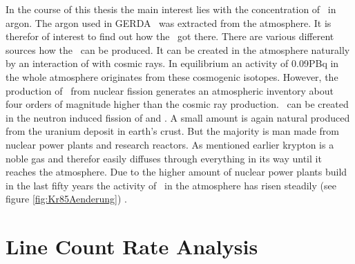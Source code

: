 \documentclass[encoding=utf8,british]{tumphthesis}
\begin{document}
In the course of this thesis the main interest lies with the concentration of \Kr\ in argon.
The argon used in GERDA \PII\ was extracted from the atmosphere.
It is therefor of interest to find out how the \Kr\ got there.
There are various different sources how the \Kr\ can be produced.
It can be created in the atmosphere naturally by an interaction of  with cosmic rays.
In equilibrium an activity of 0.09PBq in the whole atmosphere originates from these cosmogenic isotopes.
However, the production of \Kr\ from nuclear fission generates an atmospheric inventory about four orders of magnitude higher than the cosmic ray production.
\Kr\ can be created in the neutron induced fission of  and .
A small amount is again natural produced from the uranium deposit in earth's crust.
But the majority is man made from nuclear power plants and research reactors.
As mentioned earlier krypton is a noble gas and therefor easily diffuses through everything in its way until it reaches the atmosphere.
Due to the higher amount of nuclear power plants build in the last fifty years the activity of \Kr\ in the atmosphere has risen steadily (see figure \ref{fig:Kr85Aenderung}) \cite{bieringer_trace_2009}.




 
\chapter{Line Count Rate Analysis}
\label{sec:SAfrom514}
\end{document}

